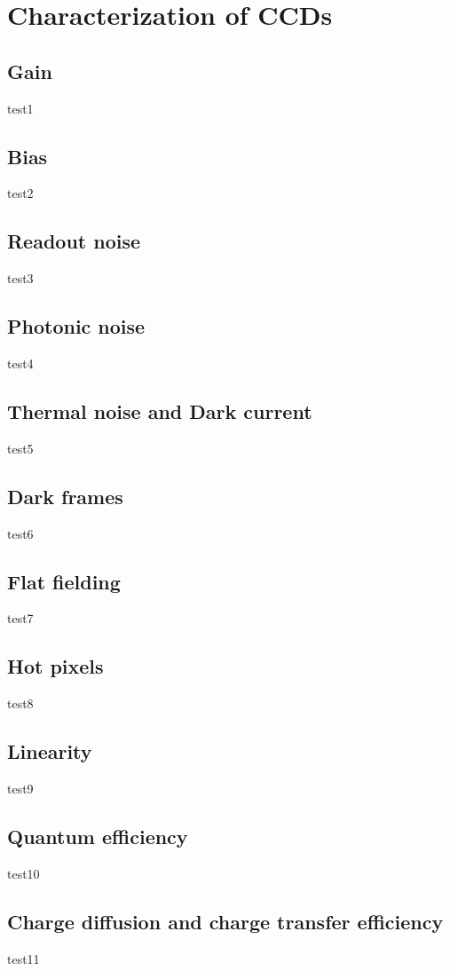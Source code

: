 \documentclass[../main.tex]{subfiles}
\begin{document}
	
	
	
	\section{Characterization of CCDs}
	
	\subsection{Gain}
	test1
	
	\subsection{Bias}
	test2
	
	\subsection{Readout noise}
	test3
	
	\subsection{Photonic noise}
	test4
	
	\subsection{Thermal noise and Dark current}
	test5
	
	\subsection{Dark frames}
	test6
	
	\subsection{Flat fielding}
	test7
	
	\subsection{Hot pixels}
	test8
	
	\subsection{Linearity}
	test9
	
	\subsection{Quantum efficiency}
	test10
	
	\subsection{Charge diffusion and charge transfer efficiency}
	test11
	
\end{document}
